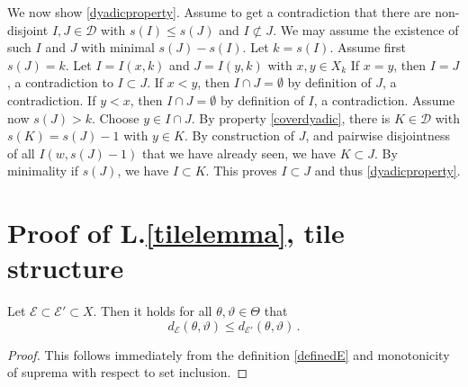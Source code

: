We now show \eqref{dyadicproperty}. Assume to get a contradiction that
there are non-disjoint $I, J\in \mathcal{D}$ with $s(I)\le s(J)$
and $I \not \subset J$. We may assume the existence of such $I$ and $J$ with minimal
$s(J)-s(I)$. Let $k=s(I)$. Assume first $s(J)=k$. Let $I=I(x,k)$ and $J=I(y,k)$ with $x,y\in X_k$ 
If $x=y$,  then $I=J$, a contradiction to $I\subset J$.
If $x<y$, then $I\cap J=\emptyset$ by definition of $J$, a contradiction.
If $y<x$, then $I\cap J=\emptyset$ by definition of $I$, a contradiction. 
Assume now $s(J)>k$. Choose $y\in I\cap J$. By property \eqref{coverdyadic},
there is $K\in \mathcal{D}$ with $s(K)=s(J)-1$ with $y\in K$. By construction
of $J$, and pairwise disjointness of all $I(w,s(J)-1)$ that we have already seen,
we have $K\subset J$. By minimality if $s(J)$, we have $I\subset K$. 
This proves $I\subset J$ and thus \eqref{dyadicproperty}.



\section{Proof of L.\ref{tilelemma}, tile structure}
\label{subsectiles}

\begin{lemma}
    \label{lem d monotone}
    Let $\mathcal{E} \subset \mathcal{E}' \subset X$. Then it holds for all $\theta, \vartheta \in \Theta$ that
    $$
        d_{\mathcal{E}}(\theta, \vartheta) \le d_{\mathcal{E}'}(\theta, \vartheta)\,.
    $$
\end{lemma}

\begin{proof}
    This follows immediately from the definition \eqref{definedE} and monotonicity of suprema with respect to set inclusion.
\end{proof}

